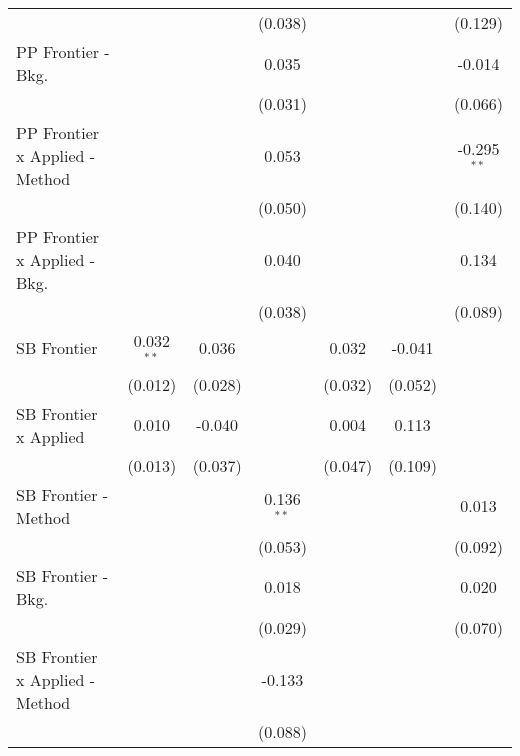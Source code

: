 \begin{tabular}{lcccccc}
                                  &              &              & (0.038)      &              &             & (0.129)\\   
   PP Frontier - Bkg.             &              &              & 0.035        &              &             & -0.014\\   
                                  &              &              & (0.031)      &              &             & (0.066)\\   
   PP Frontier x Applied - Method &              &              & 0.053        &              &             & -0.295$^{**}$\\   
                                  &              &              & (0.050)      &              &             & (0.140)\\   
   PP Frontier x Applied - Bkg.   &              &              & 0.040        &              &             & 0.134\\   
                                  &              &              & (0.038)      &              &             & (0.089)\\   
   SB Frontier                    & 0.032$^{**}$ & 0.036        &              & 0.032        & -0.041      &   \\   
                                  & (0.012)      & (0.028)      &              & (0.032)      & (0.052)     &   \\   
   SB Frontier x Applied          & 0.010        & -0.040       &              & 0.004        & 0.113       &   \\   
                                  & (0.013)      & (0.037)      &              & (0.047)      & (0.109)     &   \\   
   SB Frontier - Method           &              &              & 0.136$^{**}$ &              &             & 0.013\\   
                                  &              &              & (0.053)      &              &             & (0.092)\\   
   SB Frontier - Bkg.             &              &              & 0.018        &              &             & 0.020\\   
                                  &              &              & (0.029)      &              &             & (0.070)\\   
   SB Frontier x Applied - Method &              &              & -0.133       &              &             &   \\   
                                  &              &              & (0.088)      &              &             &   \\   

\end{tabular}
